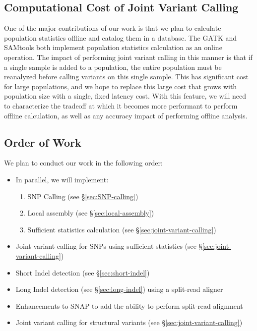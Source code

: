 \documentclass[11pt]{article}
\begin{document}
\subsection{Computational Cost of Joint Variant Calling}
\label{sec:computational-cost-joint}

One of the major contributions of our work is that we plan to calculate population statistics offline and catalog them in a database.
The GATK \cite {mckenna10} and SAMtools \cite{li11} both implement population statistics calculation as an online operation. The
impact of performing joint variant calling in this manner is that if a single sample is added to a population, the entire population
must be reanalyzed before calling variants on this single sample. This has significant cost for large populations, and we hope to
replace this large cost that grows with population size with a single, fixed latency cost. With this feature, we will need to characterize
the tradeoff at which it becomes more performant to perform offline calculation, as well as any accuracy impact of performing offline
analysis.

\subsection{Order of Work}
\label{sec:order-of-work}

We plan to conduct our work in the following order:

\begin{itemize}
\item In parallel, we will implement:
\begin{enumerate}
\item SNP Calling (see \S\ref{sec:SNP-calling})
\item Local assembly (see \S\ref{sec:local-assembly})
\item Sufficient statistics calculation (see \S\ref{sec:joint-variant-calling})
\end{enumerate}
\item Joint variant calling for SNPs using sufficient statistics (see \S\ref{sec:joint-variant-calling})
\item Short Indel detection (see \S\ref{sec:short-indel})
\item Long Indel detection (see \S\ref{sec:long-indel}) using a split-read aligner
\item Enhancements to SNAP to add the ability to perform split-read alignment
\item Joint variant calling for structural variants (see \S\ref{sec:joint-variant-calling})
\end{itemize}

\small




\end{document}
